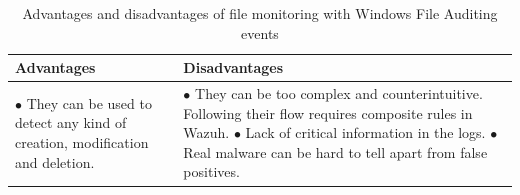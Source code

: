 \begin{table}[H]
	\begin{tabularx}{\textwidth}{|w|w|}
		\hline
		Advantages & Disadvantages\\ \hline
			$\bullet$ They can be used to detect any kind of creation, modification and deletion.
		&
			$\bullet$ They can be too complex and counterintuitive. Following their flow requires composite rules in Wazuh.
			\linej $\bullet$ Lack of critical information in the logs.
			\linej $\bullet$ Real malware can be hard to tell apart from false positives.
			\\ \hline
	\end{tabularx}
	\caption{Advantages and disadvantages of file monitoring with Windows File Auditing events}
\end{table}

